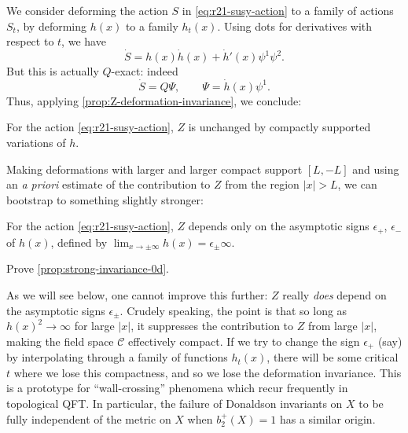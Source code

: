 \documentclass[12pt,letterpaper,reqno]{article}
\numberwithin{equation}{section}
\newcommand{\cC}{\ensuremath{\mathcal C}}
\newcommand{\abs}[1]{\lvert#1\rvert}
\newcommand{\eps}{\epsilon}
\newcommand{\ti}[1]{\textit{#1}}
\begin{document}
We consider deforming the action $S$ in \eqref{eq:r21-susy-action} 
to a family of actions $S_t$, by deforming $h(x)$
to a family $h_t(x)$.
Using dots for derivatives with respect to $t$, we have
\begin{equation}
  \dot S = h(x) {\dot h}(x) + {\dot h}'(x) \psi^1 \psi^2. 
\end{equation}
But this is actually $Q$-exact: indeed
\begin{equation} \label{eq:psi-example}
  \dot S = Q \Psi, \qquad \Psi = {\dot h}(x) \psi^1.
\end{equation}
Thus, applying \autoref{prop:Z-deformation-invariance},
we conclude:
\begin{prop} 
For the action \eqref{eq:r21-susy-action}, 
$Z$ is unchanged by compactly supported variations of $h$.
\end{prop}

Making deformations with larger and larger compact support $[L,-L]$ and
using an \ti{a priori} estimate of the contribution to $Z$ from
the region $\abs{x} > L$, we can bootstrap to something slightly stronger:
\begin{prop} \label{prop:strong-invariance-0d}
For the action \eqref{eq:r21-susy-action}, 
$Z$ depends only on the asymptotic signs $\eps_+$, $\eps_-$ of $h(x)$,
defined by $\lim_{x \to \pm \infty} h(x) = \eps_{\pm} \infty$.
\end{prop}

\begin{exercise} Prove \autoref{prop:strong-invariance-0d}.
\end{exercise}

As we will see below, one cannot improve this further: $Z$ really
\ti{does} depend on the asymptotic signs $\eps_{\pm}$.
Crudely speaking, the point is that so long as $h(x)^2 \to \infty$
for large $\abs{x}$, it suppresses the contribution to $Z$ 
from large $\abs{x}$, 
making the field space $\cC$ effectively compact. If we try to change
the sign $\eps_+$ (say) by interpolating through a family of functions 
$h_t(x)$, there will be some critical $t$ where we lose this compactness,
and so we lose the deformation invariance.
This is a prototype for ``wall-crossing'' phenomena 
which recur frequently in 
topological QFT. In particular, the failure of Donaldson invariants on $X$
to be fully independent of the metric 
on $X$ when $b_2^+(X) = 1$ has a similar origin.
\end{document}
